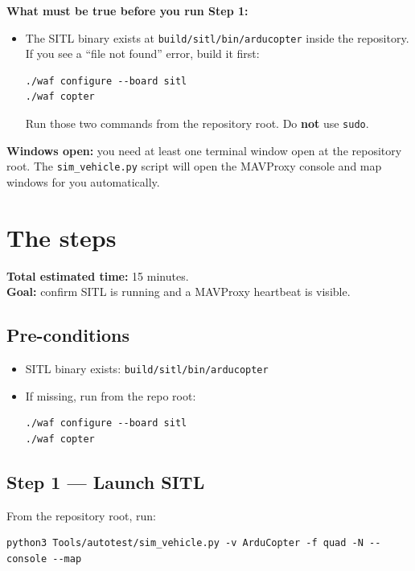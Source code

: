 \documentclass[a4paper,11pt,twoside]{article}
\begin{document}
\textbf{What must be true before you run Step 1:}
\begin{itemize}
  \item The SITL binary exists at \texttt{build/sitl/bin/arducopter} inside the repository. If you see a ``file not found'' error, build it first:
\begin{Verbatim}[frame=single,fontsize=\small]
./waf configure --board sitl
./waf copter
\end{Verbatim}
  Run those two commands from the repository root. Do \textbf{not} use \texttt{sudo}.
\end{itemize}

\textbf{Windows open:} you need at least one terminal window open at the repository root. The \texttt{sim\_vehicle.py} script will open the MAVProxy console and map windows for you automatically.

\section*{The steps}

\textbf{Total estimated time:} 15 minutes.\\
\textbf{Goal:} confirm SITL is running and a MAVProxy heartbeat is visible.

\subsection*{Pre-conditions}
\begin{itemize}
  \item SITL binary exists: \texttt{build/sitl/bin/arducopter}
  \item If missing, run from the repo root:
\begin{Verbatim}[frame=single,fontsize=\small]
./waf configure --board sitl
./waf copter
\end{Verbatim}
\end{itemize}

\subsection*{Step 1 --- Launch SITL}

From the repository root, run:

\begin{Verbatim}[frame=single,fontsize=\small]
python3 Tools/autotest/sim_vehicle.py -v ArduCopter -f quad -N --console --map
\end{Verbatim}
\end{document}
